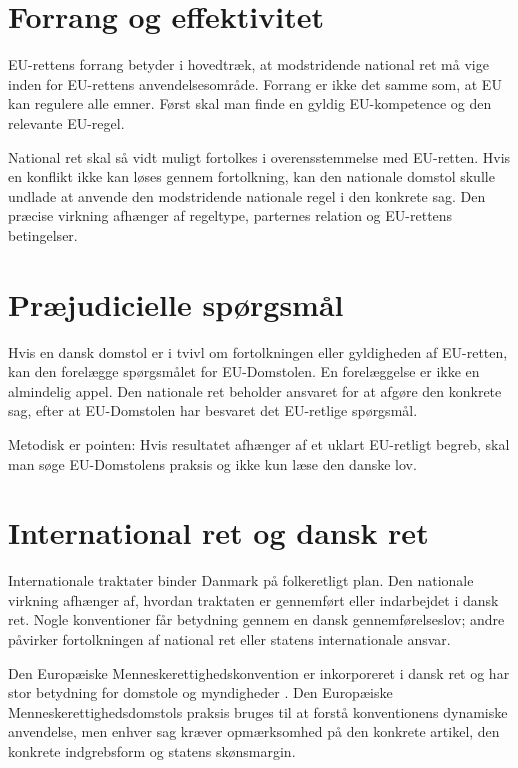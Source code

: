 \section{Forrang og effektivitet}

EU-rettens forrang betyder i hovedtræk, at modstridende national ret må vige inden for EU-rettens anvendelsesområde. Forrang er ikke det samme som, at EU kan regulere alle emner. Først skal man finde en gyldig EU-kompetence og den relevante EU-regel.

National ret skal så vidt muligt fortolkes i overensstemmelse med EU-retten. Hvis en konflikt ikke kan løses gennem fortolkning, kan den nationale domstol skulle undlade at anvende den modstridende nationale regel i den konkrete sag. Den præcise virkning afhænger af regeltype, parternes relation og EU-rettens betingelser.

\section{Præjudicielle spørgsmål}

Hvis en dansk domstol er i tvivl om fortolkningen eller gyldigheden af EU-retten, kan den forelægge spørgsmålet for EU-Domstolen. En forelæggelse er ikke en almindelig appel. Den nationale ret beholder ansvaret for at afgøre den konkrete sag, efter at EU-Domstolen har besvaret det EU-retlige spørgsmål.

Metodisk er pointen: Hvis resultatet afhænger af et uklart EU-retligt begreb, skal man søge EU-Domstolens praksis og ikke kun læse den danske lov.

\section{International ret og dansk ret}

Internationale traktater binder Danmark på folkeretligt plan. Den nationale virkning afhænger af, hvordan traktaten er gennemført eller indarbejdet i dansk ret. Nogle konventioner får betydning gennem en dansk gennemførelseslov; andre påvirker fortolkningen af national ret eller statens internationale ansvar.

Den Europæiske Menneskerettighedskonvention er inkorporeret i dansk ret og har stor betydning for domstole og myndigheder \citep{echr,menneskerettighedsloven}. Den Europæiske Menneskerettighedsdomstols praksis bruges til at forstå konventionens dynamiske anvendelse, men enhver sag kræver opmærksomhed på den konkrete artikel, den konkrete indgrebsform og statens skønsmargin.


